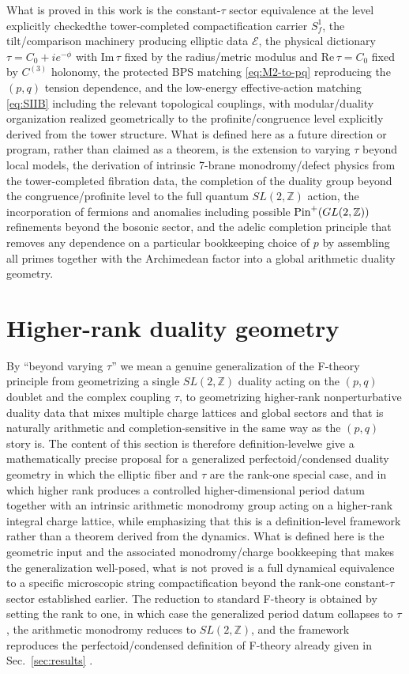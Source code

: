 \documentclass[11pt]{article}
\theoremstyle{remark}
\newcommand{\Z}{\mathbb{Z}}
\newcommand{\calE}{\mathcal{E}}
\begin{document}
What is proved in this work is the constant-\(\tau\) sector equivalence at the level explicitly checked\:the tower-completed compactification carrier \(S_f^{1}\), the tilt/comparison machinery producing elliptic data \(\calE\), the physical dictionary \(\tau=C_{0}+ie^{-\phi}\) with \(\mathrm{Im}\,\tau\) fixed by the radius/metric modulus and \(\mathrm{Re}\,\tau=C_{0}\) fixed by \(C^{(3)}\) holonomy, the protected BPS matching \eqref{eq:M2-to-pq} reproducing the \((p,q)\) tension dependence, and the low-energy effective-action matching \eqref{eq:SIIB} including the relevant topological couplings, with modular/duality organization realized geometrically to the profinite/congruence level explicitly derived from the tower structure. What is defined here as a future direction or program, rather than claimed as a theorem, is the extension to varying \(\tau\) beyond local models, the derivation of intrinsic 7-brane monodromy/defect physics from the tower-completed fibration data, the completion of the duality group beyond the congruence/profinite level to the full quantum \(SL(2,\Z)\) action, the incorporation of fermions and anomalies including possible \({\rm Pin}^{+}(GL(2,\Z))\) refinements beyond the bosonic sector, and the adelic completion principle that removes any dependence on a particular bookkeeping choice of \(p\) by assembling all primes together with the Archimedean factor into a global arithmetic duality geometry.

\section{Higher-rank duality geometry}\label{sec:beyondI}

By ``beyond varying \(\tau\)'' we mean a genuine generalization of the F-theory principle from geometrizing a single \(SL(2,\Z)\) duality acting on the \((p,q)\) doublet and the complex coupling \(\tau\), to geometrizing higher-rank nonperturbative duality data that mixes multiple charge lattices and global sectors and that is naturally arithmetic and completion-sensitive in the same way as the \((p,q)\) story is. The content of this section is therefore definition-level\:we give a mathematically precise proposal for a generalized perfectoid/condensed duality geometry in which the elliptic fiber and \(\tau\) are the rank-one special case, and in which higher rank produces a controlled higher-dimensional period datum together with an intrinsic arithmetic monodromy group acting on a higher-rank integral charge lattice, while emphasizing that this is a definition-level framework rather than a theorem derived from the dynamics. What is defined here is the geometric input and the associated monodromy/charge bookkeeping that makes the generalization well-posed, what is not proved is a full dynamical equivalence to a specific microscopic string compactification beyond the rank-one constant-\(\tau\) sector established earlier. The reduction to standard F-theory is obtained by setting the rank to one, in which case the generalized period datum collapses to \(\tau\), the arithmetic monodromy reduces to \(SL(2,\Z)\), and the framework reproduces the perfectoid/condensed definition of F-theory already given in Sec.~\ref{sec:results} \cite{Vafa1996}.
\end{document}
